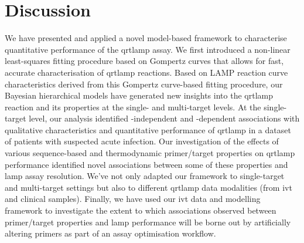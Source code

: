 \documentclass[../thesis.tex]{subfiles}
\begin{document}
\section{Discussion \label{sec:discussion}}
We have presented and applied a novel model-based framework to characterise quantitative performance of the \gls{qrtlamp} assay. We first introduced a non-linear least-squares fitting procedure based on Gompertz curves that allows for fast, accurate characterisation of \gls{qrtlamp} reactions. Based on LAMP reaction curve characteristics derived from this Gompertz curve-based fitting procedure, our Bayesian hierarchical models  have generated new insights into the \gls{qrtlamp} reaction and its properties at the single- and multi-target levels. At the single-target level, our analysis identified -independent and -dependent associations with qualitative characteristics and quantitative performance of \gls{qrtlamp} in a dataset of patients with suspected acute infection. Our investigation of the effects of various sequence-based and thermodynamic primer/target properties on \gls{qrtlamp} performance identified novel associations between some of these properties and \gls{lamp} assay resolution. We've not only adapted our framework to single-target and multi-target settings but also to different \gls{qrtlamp} data modalities (from \gls{ivt}  and clinical samples). Finally, we have used our \gls{ivt}  data and modelling framework to investigate the extent to which associations observed between primer/target properties and \gls{lamp} performance will be borne out by artificially altering primers as part of an assay optimisation workflow. 
\end{document}
